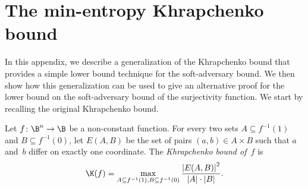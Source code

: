 \documentclass{toc}
\begin{document}
\section{\label{sec:min-khrapchenko}The min-entropy Khrapchenko bound}

In this appendix, we describe a generalization of the Khrapchenko
bound that provides a simple %
lower bound technique for %
the soft-adversary
bound. We then show how this generalization can be used to give an
alternative proof for the lower bound on the soft-adversary bound
of the surjectivity function. We start by recalling the original Khrapchenko
bound.
\begin{repdefinition}{}
Let $f\colon\B^{n}\to\B$ be a non-constant function. For every two
sets $A\subseteq f^{-1}(1)$ and $B\subseteq f^{-1}(0)$, let $E(A,B)$
be the set of pairs $(a,b)\in A\times B$ such that $a$ and~$b$
differ on exactly one coordinate. The \emph{Khrapchenko bound of~$f$}
is 
\[
\K(f)=\max_{A\subseteq f^{-1}(1),B\subseteq f^{-1}(0)}\frac{\left|E(A,B)\right|^{2}}{\left|A\right|\cdot\left|B\right|}.
\]
\end{repdefinition}
\end{document}
